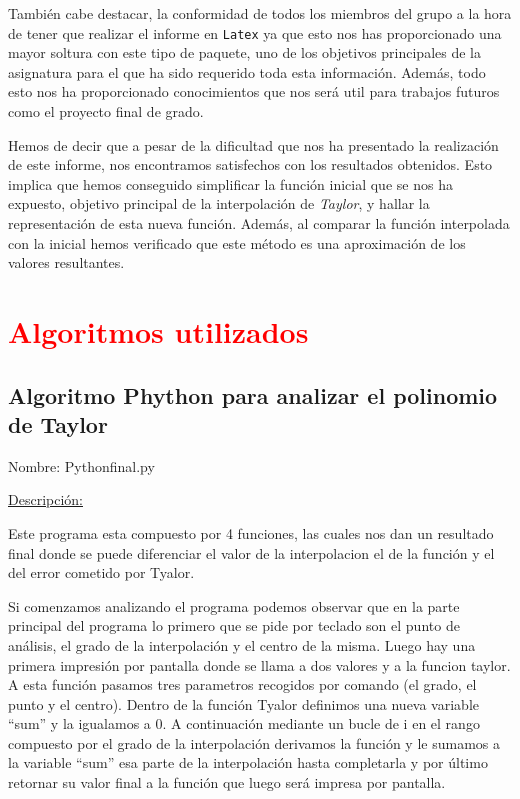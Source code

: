 \documentclass[a4paper,12pt]{article}
\begin{document}
También cabe destacar, la conformidad de todos los miembros del grupo a la hora de tener que realizar el informe en {\tt Latex} ya que esto nos has proporcionado una mayor soltura con este tipo 
de paquete, uno de los objetivos principales de la asignatura para el que ha sido requerido toda esta información. Además, todo esto nos ha proporcionado conocimientos 
que nos será util para trabajos futuros como el proyecto final de grado.


Hemos de decir que a pesar de la dificultad que nos ha presentado la realización de este informe, nos encontramos  satisfechos con los resultados obtenidos. 
Esto implica que hemos conseguido simplificar la función inicial que se nos ha expuesto, objetivo principal de la interpolación de {\em Taylor}, y hallar la representación de esta nueva función.
Además, al comparar  la función interpolada con la inicial hemos verificado que este método es una  aproximación de los valores resultantes.
\newpage
\section{\textcolor{red}{Algoritmos utilizados}}
\subsection{Algoritmo Phython para analizar el polinomio de Taylor}

 Nombre: Pythonfinal.py
 
 

\underline{Descripción:}

Este programa esta compuesto por 4 funciones, las cuales nos dan un resultado final donde se puede diferenciar el valor de la interpolacion el de la función y el del 
error cometido por Tyalor.

Si comenzamos analizando el programa podemos observar que en la parte principal del programa lo primero que se pide por teclado son el punto de análisis, el grado de la interpolación
y el centro de la misma. Luego hay una primera impresión por pantalla donde se llama a dos valores y a la funcion taylor. A esta función pasamos tres parametros recogidos 
por comando (el grado, el punto y el centro). Dentro de la función Tyalor definimos una nueva variable ``sum'' y la igualamos a 0. A continuación mediante un bucle de i en 
el rango compuesto por el grado de la interpolación derivamos la función y le sumamos a la variable ``sum'' esa parte de la interpolación hasta completarla y por último retornar
su valor final a la función que luego será impresa por pantalla.
\end{document}
